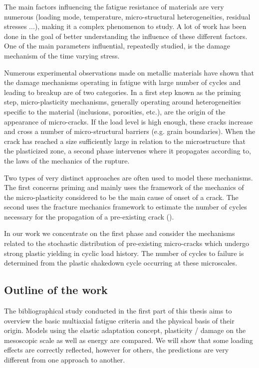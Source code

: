 The main factors influencing the fatigue resistance of materials are very numerous
(loading mode, temperature, micro-structural heterogeneities, residual stresses ...),
making it a complex phenomenon to study. A lot of work has been done in the goal of
better understanding the influence of these different factors. One of the main parameters
influential, repeatedly studied, is the damage mechanism of the time varying stress.

Numerous experimental observations made on metallic materials have shown
that the damage mechanisms operating in fatigue with large number of cycles and
leading to breakup are of two categories. In a first step known as the priming step,
micro-plasticity mechanisms, generally operating around heterogeneities specific to the
material (inclusions, porosities, etc.), are the origin of the appearance of micro-cracks. If the load level is high enough, these cracks increase and cross a number of micro-structural barriers (e.g. grain boundaries). When the crack has reached a size
sufficiently large in relation to the microstructure that the plasticized zone, a second phase intervenes where it propagates according to, the laws of the mechanics of the rupture.

Two types of very distinct approaches are often used to model these mechanisms. The
first concerns priming and mainly uses the framework of the mechanics of the
micro-plasticity considered to be the main cause of onset
of a crack. The second uses the fracture mechanics framework to estimate the number
of cycles necessary for the propagation of a pre-existing crack (\cite{koutiri2011effet}). 

In our work we concentrate on the first phase and consider the mechanisms related to the stochastic distribution of pre-existing micro-cracks which undergo strong plastic yielding in cyclic load history. The number of cycles to failure is determined from the plastic shakedown cycle occurring at these microscales.

\subsection{Outline of the work}
The bibliographical study conducted in the first part of this thesis aims to
overview the basic multiaxial fatigue criteria and the physical basis of their origin. Models using the elastic adaptation concept, plasticity / damage on the mesoscopic scale as well as energy
are compared. We will show that some loading effects are correctly reflected, however for others, the predictions are very different from one approach to another.


